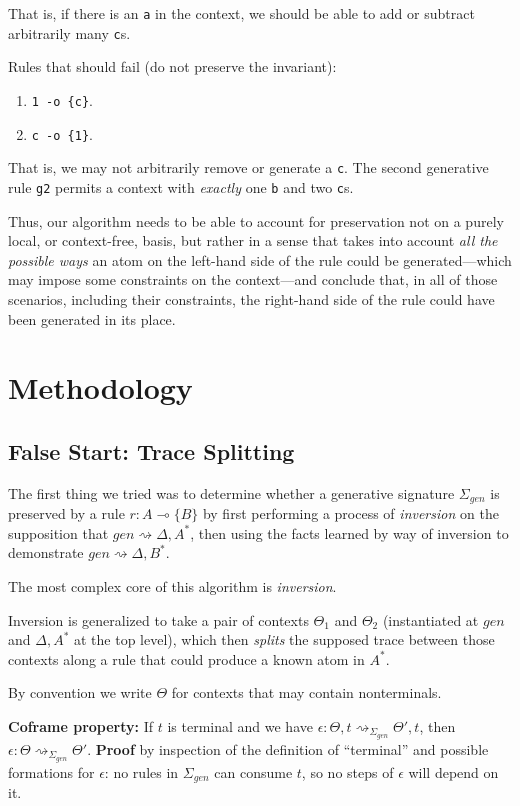 \documentclass[fullpage, 11pt]{article}
\newcommand{\lolli}{\multimap}
\newcommand{\mon}[1]{\{#1\}}
\newcommand{\stepsto}{\rightsquigarrow}
\begin{document}
That is, if there is an \verb|a| in the context, we should be able to add
or subtract arbitrarily many \verb|c|s.

Rules that should fail (do not preserve the invariant):
\begin{enumerate}
\item \verb|1 -o {c}|.
\item \verb|c -o {1}|.
\end{enumerate}

That is, we may not arbitrarily remove or generate a \verb|c|. The second
generative rule \verb|g2| permits a context with {\em exactly} one \verb|b|
and two \verb|c|s.

Thus, our algorithm needs to be able to account for preservation not on a purely
local, or context-free, basis, but rather in a sense that takes into
account {\em all the possible ways} an atom on the left-hand side of the
rule could be generated---which may impose some constraints on the
context---and conclude that, in all of those scenarios, including their
constraints, the right-hand side of the rule could have been generated in
its place.

\section{Methodology}

\subsection{False Start: Trace Splitting}

The first thing we tried was to determine whether a generative signature
$\Sigma_{gen}$ is preserved by a rule $r : A \lolli \mon{B}$ by first
performing a process of {\em inversion} on the supposition that $gen
\stepsto \Delta, A^*$, then using the facts learned by way of inversion to
demonstrate $gen \stepsto \Delta, B^*$.

The most complex core of this algorithm is {\em inversion}.

Inversion is generalized to take a pair of contexts $\Theta_1$ and
$\Theta_2$ (instantiated at $gen$ and $\Delta, A^*$ at the top level),
which then {\em splits} the supposed trace between those contexts along a
rule that could produce a known atom in $A^*$.

By convention we write $\Theta$ for contexts that may contain nonterminals.

{\bf Coframe property:} If $t$ is terminal and we have $\epsilon : \Theta, t
\stepsto_{\Sigma_{gen}} \Theta', t$, then $\epsilon : \Theta
\stepsto_{\Sigma_{gen}} \Theta'$. {\bf Proof} by inspection of the
definition of ``terminal'' and possible formations for $\epsilon$: no rules
in $\Sigma_{gen}$ can consume $t$, so no steps of $\epsilon$ will depend on
it.
\end{document}
